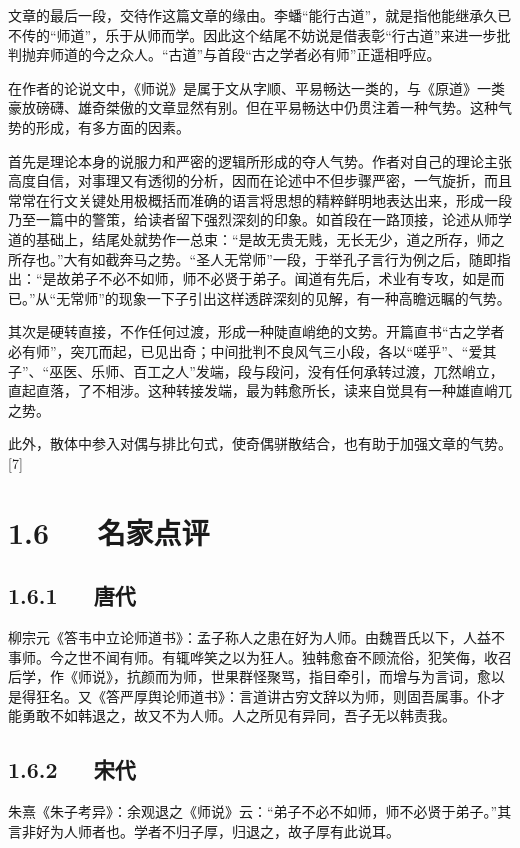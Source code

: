 \documentclass[letterpaper,12pt,english]{sphinxmanual}
\begin{document}
文章的最后一段，交待作这篇文章的缘由。李蟠“能行古道”，就是指他能继承久已不传的“师道”，乐于从师而学。因此这个结尾不妨说是借表彰“行古道”来进一步批判抛弃师道的今之众人。“古道”与首段“古之学者必有师”正遥相呼应。

在作者的论说文中，《师说》是属于文从字顺、平易畅达一类的，与《原道》一类豪放磅礴、雄奇桀傲的文章显然有别。但在平易畅达中仍贯注着一种气势。这种气势的形成，有多方面的因素。

首先是理论本身的说服力和严密的逻辑所形成的夺人气势。作者对自己的理论主张高度自信，对事理又有透彻的分析，因而在论述中不但步骤严密，一气旋折，而且常常在行文关键处用极概括而准确的语言将思想的精粹鲜明地表达出来，形成一段乃至一篇中的警策，给读者留下强烈深刻的印象。如首段在一路顶接，论述从师学道的基础上，结尾处就势作一总束：“是故无贵无贱，无长无少，道之所存，师之所存也。”大有如截奔马之势。“圣人无常师”一段，于举孔子言行为例之后，随即指出：“是故弟子不必不如师，师不必贤于弟子。闻道有先后，术业有专攻，如是而已。”从“无常师”的现象一下子引出这样透辟深刻的见解，有一种高瞻远瞩的气势。

其次是硬转直接，不作任何过渡，形成一种陡直峭绝的文势。开篇直书“古之学者必有师”，突兀而起，已见出奇；中间批判不良风气三小段，各以“嗟乎”、“爱其子”、“巫医、乐师、百工之人”发端，段与段问，没有任何承转过渡，兀然峭立，直起直落，了不相涉。这种转接发端，最为韩愈所长，读来自觉具有一种雄直峭兀之势。

此外，散体中参入对偶与排比句式，使奇偶骈散结合，也有助于加强文章的气势。{[}7{]}


\section{1.6   名家点评}
\label{\detokenize{p01_u6563_u6587/_u97e9_u6108-_u5e08_u8bf4:id8}}

\subsection{1.6.1   唐代}
\label{\detokenize{p01_u6563_u6587/_u97e9_u6108-_u5e08_u8bf4:id9}}
柳宗元《答韦中立论师道书》：孟子称人之患在好为人师。由魏晋氏以下，人益不事师。今之世不闻有师。有辄哗笑之以为狂人。独韩愈奋不顾流俗，犯笑侮，收召后学，作《师说》，抗颜而为师，世果群怪聚骂，指目牵引，而增与为言词，愈以是得狂名。又《答严厚舆论师道书》：言道讲古穷文辞以为师，则固吾属事。仆才能勇敢不如韩退之，故又不为人师。人之所见有异同，吾子无以韩责我。


\subsection{1.6.2   宋代}
\label{\detokenize{p01_u6563_u6587/_u97e9_u6108-_u5e08_u8bf4:id10}}
朱熹《朱子考异》：余观退之《师说》云：“弟子不必不如师，师不必贤于弟子。”其言非好为人师者也。学者不归子厚，归退之，故子厚有此说耳。
\end{document}
